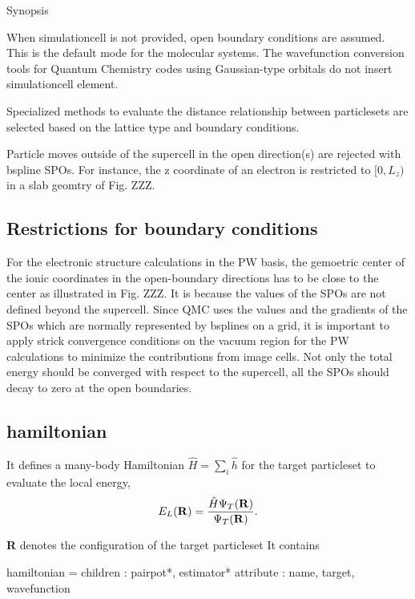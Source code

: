 Synopsis 
\begin{DoxyItemize}
\item When {\ttfamily simulationcell} is not provided, open boundary conditions are assumed. This is the default mode for the molecular systems. The wavefunction conversion tools for Quantum Chemistry codes using Gaussian-\/type orbitals do not insert {\ttfamily simulationcell} element.  
\item Specialized methods to evaluate the distance relationship between {\ttfamily particleset}s are selected based on the lattice type and boundary conditions. 


\item Particle moves outside of the supercell in the open direction(s) are rejected with bspline S\-P\-Os. For instance, the z coordinate of an electron is restricted to $[0,L_z)$ in a slab geomtry of Fig. Z\-Z\-Z. 
\end{DoxyItemize}\subsection{Restrictions for boundary conditions}\label{a00004_bcondsR}
For the electronic structure calculations in the P\-W basis, the gemoetric center of the ionic coordinates in the open-\/boundary directions has to be close to the center as illustrated in Fig. Z\-Z\-Z. It is because the values of the S\-P\-Os are not defined beyond the supercell. Since Q\-M\-C uses the values and the gradients of the S\-P\-Os which are normally represented by bsplines on a grid, it is important to apply strick convergence conditions on the vacuum region for the P\-W calculations to minimize the contributions from image cells. Not only the total energy should be converged with respect to the supercell, all the S\-P\-Os should decay to zero at the open boundaries.\subsection{hamiltonian}\label{a00004_hamiltonianX}
It defines a many-\/body Hamiltonian $\hat{H}=\sum_i \hat{h}$ for the target {\ttfamily particleset} to evaluate the local energy, \[ E_L({\bf R})=\frac{\hat{H}\Psi_T({\bf R})}{\Psi_T({\bf R})}. \]

{\bfseries R} denotes the configuration of the target {\ttfamily particleset} It contains 
\begin{DoxyCode}
hamiltonian = 
  children  : pairpot*, estimator*
  attribute : name, target, wavefunction
\end{DoxyCode}



